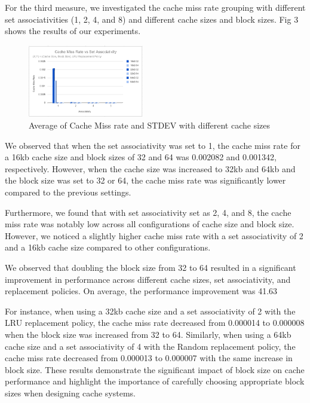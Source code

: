 \documentclass[conference]{IEEEtran}
\begin{document}
For the third measure, we investigated the cache miss rate grouping with different set associativities (1, 2, 4, and 8) and different cache sizes and block sizes. Fig 3 shows the results of our experiments.

\begin{figure}[H]
    \centering
    \includegraphics[width=0.45\textwidth]{sha/sha_cache_vs_setAssoc.png}
    \caption{Average of Cache Miss rate and STDEV with different cache sizes}
\end{figure}

We observed that when the set associativity was set to 1, the cache miss rate for a 16kb cache size and block sizes of 32 and 64 was 0.002082 and 0.001342, respectively. However, when the cache size was increased to 32kb and 64kb and the block size was set to 32 or 64, the cache miss rate was significantly lower compared to the previous settings.

Furthermore, we found that with set associativity set as 2, 4, and 8, the cache miss rate was notably low across all configurations of cache size and block size. However, we noticed a slightly higher cache miss rate with a set associativity of 2 and a 16kb cache size compared to other configurations.

We observed that doubling the block size from 32 to 64 resulted in a significant improvement in performance across different cache sizes, set associativity, and replacement policies. On average, the performance improvement was 41.63%

For instance, when using a 32kb cache size and a set associativity of 2 with the LRU replacement policy, the cache miss rate decreased from 0.000014 to 0.000008 when the block size was increased from 32 to 64. Similarly, when using a 64kb cache size and a set associativity of 4 with the Random replacement policy, the cache miss rate decreased from 0.000013 to 0.000007 with the same increase in block size. These results demonstrate the significant impact of block size on cache performance and highlight the importance of carefully choosing appropriate block sizes when designing cache systems.
\end{document}
